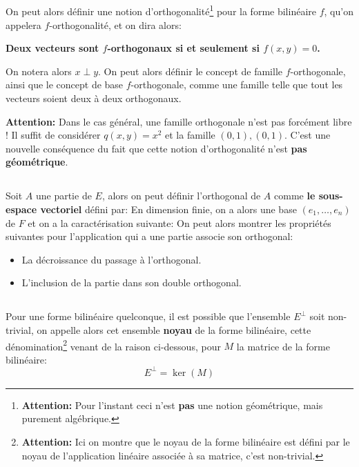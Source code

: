 \subsection*{}
On peut alors définir une notion d'orthogonalité\footnote[1]{\textbf{Attention:} Pour l'instant ceci n'est \textbf{pas} une notion géométrique, mais purement algébrique.} pour la forme bilinéaire \(f\), qu'on appelera \(f\)-orthogonalité, et on dira alors: 
\begin{center}
   \textbf{Deux vecteurs sont \(f\)-orthogonaux si et seulement si \(f(x, y) = 0\).}
\end{center}
On notera alors \(x \perp y\). On peut alors définir le concept de famille \(f\)-orthogonale, ainsi que le concept de base \(f\)-orthogonale, comme une famille telle que tout les vecteurs soient deux à deux orthogonaux.\<

\textbf{Attention:} Dans le cas général, une famille orthogonale n'est pas forcément libre ! Il suffit de considérer \(q(x, y) = x^2\) et la famille \((0, 1), (0, 1)\). C'est une nouvelle conséquence du fait que cette notion d'orthogonalité n'est \textbf{pas géométrique}.
\subsection*{}
Soit \(A\) une partie de \(E\), alors on peut définir l'orthogonal de \(A\) comme \textbf{le sous-espace vectoriel} défini par:
En dimension finie, on a alors une base \((e_1, \ldots, e_n)\) de \(F\) et on a la caractérisation suivante:
On peut alors montrer les propriétés suivantes pour l'application qui a une partie associe son orthogonal:
\begin{itemize}
   \item La décroissance du passage à l'orthogonal.
   \item L'inclusion de la partie dans son double orthogonal.
\end{itemize}
\subsection*{}
Pour une forme bilinéaire quelconque, il est possible que l'ensemble \(E^\perp\) soit non-trivial, on appelle alors cet ensemble \textbf{noyau} de la forme bilinéaire, cette dénomination\footnote[2]{\textbf{Attention:} Ici on montre que le noyau de la forme bilinéaire est défini par le noyau de l'application linéaire associée à sa matrice, c'est non-trivial.} venant de la raison ci-dessous, pour \(M\) la matrice de la forme bilinéaire:
\[
   E^\perp = \ker(M)
\]
\pagebreak

